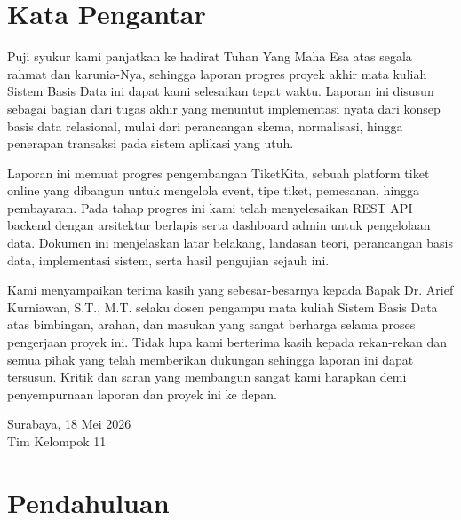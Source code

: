 \documentclass[12pt,a4paper]{report}
\begin{document}
\chapter*{Kata Pengantar}

Puji syukur kami panjatkan ke hadirat Tuhan Yang Maha Esa atas segala rahmat dan karunia-Nya, sehingga laporan progres proyek akhir mata kuliah Sistem Basis Data ini dapat kami selesaikan tepat waktu. Laporan ini disusun sebagai bagian dari tugas akhir yang menuntut implementasi nyata dari konsep basis data relasional, mulai dari perancangan skema, normalisasi, hingga penerapan transaksi pada sistem aplikasi yang utuh.

Laporan ini memuat progres pengembangan TiketKita, sebuah platform tiket online yang dibangun untuk mengelola event, tipe tiket, pemesanan, hingga pembayaran. Pada tahap progres ini kami telah menyelesaikan REST API backend dengan arsitektur berlapis serta dashboard admin untuk pengelolaan data. Dokumen ini menjelaskan latar belakang, landasan teori, perancangan basis data, implementasi sistem, serta hasil pengujian sejauh ini.

Kami menyampaikan terima kasih yang sebesar-besarnya kepada Bapak Dr. Arief Kurniawan, S.T., M.T. selaku dosen pengampu mata kuliah Sistem Basis Data atas bimbingan, arahan, dan masukan yang sangat berharga selama proses pengerjaan proyek ini. Tidak lupa kami berterima kasih kepada rekan-rekan dan semua pihak yang telah memberikan dukungan sehingga laporan ini dapat tersusun. Kritik dan saran yang membangun sangat kami harapkan demi penyempurnaan laporan dan proyek ini ke depan.

\vspace{1cm}
\begin{flushright}
Surabaya, 18 Mei 2026\\[1cm]
Tim Kelompok 11
\end{flushright}

\tableofcontents
\listoffigures
\listoftables

\chapter{Pendahuluan}
\end{document}
